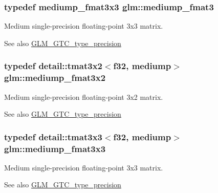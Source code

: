\subsubsection[{\texorpdfstring{mediump\+\_\+fmat3}{mediump_fmat3}}]{\setlength{\rightskip}{0pt plus 5cm}typedef mediump\+\_\+fmat3x3 {\bf glm\+::mediump\+\_\+fmat3}}\hypertarget{group__gtc__type__precision_ga85f2267401434ea8c5463af040f0760c}{}\label{group__gtc__type__precision_ga85f2267401434ea8c5463af040f0760c}
Medium single-\/precision floating-\/point 3x3 matrix. \begin{DoxySeeAlso}{See also}
\hyperlink{group__gtc__type__precision}{G\+L\+M\+\_\+\+G\+T\+C\+\_\+type\+\_\+precision} 
\end{DoxySeeAlso}
\subsubsection[{\texorpdfstring{mediump\+\_\+fmat3x2}{mediump_fmat3x2}}]{\setlength{\rightskip}{0pt plus 5cm}typedef detail\+::tmat3x2$<$f32, mediump$>$ {\bf glm\+::mediump\+\_\+fmat3x2}}\hypertarget{group__gtc__type__precision_ga40681f25413b8705b16da2f534692f59}{}\label{group__gtc__type__precision_ga40681f25413b8705b16da2f534692f59}
Medium single-\/precision floating-\/point 3x2 matrix. \begin{DoxySeeAlso}{See also}
\hyperlink{group__gtc__type__precision}{G\+L\+M\+\_\+\+G\+T\+C\+\_\+type\+\_\+precision} 
\end{DoxySeeAlso}
\subsubsection[{\texorpdfstring{mediump\+\_\+fmat3x3}{mediump_fmat3x3}}]{\setlength{\rightskip}{0pt plus 5cm}typedef detail\+::tmat3x3$<$f32, mediump$>$ {\bf glm\+::mediump\+\_\+fmat3x3}}\hypertarget{group__gtc__type__precision_gaa7f015dd5b962a658178bb881d4620cc}{}\label{group__gtc__type__precision_gaa7f015dd5b962a658178bb881d4620cc}
Medium single-\/precision floating-\/point 3x3 matrix. \begin{DoxySeeAlso}{See also}
\hyperlink{group__gtc__type__precision}{G\+L\+M\+\_\+\+G\+T\+C\+\_\+type\+\_\+precision} 
\end{DoxySeeAlso}

